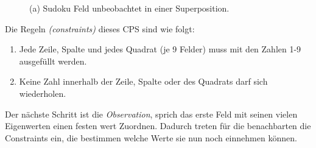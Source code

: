 \documentclass[12pt]{report}
\begin{document}
\begin{figure}[H]
    \centering
    \caption{(a) Sudoku Feld unbeobachtet in einer Superposition.}%
\end{figure}

Die Regeln \textit{(constraints)} dieses CPS sind wie folgt:
\begin{enumerate}
    \item Jede Zeile, Spalte und jedes Quadrat {(je 9 Felder)} muss mit den Zahlen 1-9 ausgefüllt werden.
    \item Keine Zahl innerhalb der Zeile, Spalte oder des Quadrats darf sich wiederholen.
\end{enumerate}

Der nächste Schritt ist die \textit{Observation}, sprich das erste Feld mit seinen vielen Eigenwerten einen festen wert Zuordnen.
Dadurch treten für die benachbarten die Constraints ein, die bestimmen welche Werte sie nun noch einnehmen können.
\end{document}
